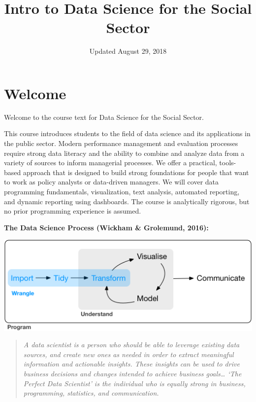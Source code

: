 \documentclass[]{book}
\title{Intro to Data Science for the Social Sector}
\author{}
\date{Updated August 29, 2018}
\theoremstyle{definition}
\theoremstyle{definition}
\theoremstyle{definition}
\theoremstyle{remark}
\begin{document}
\maketitle

{
\setcounter{tocdepth}{1}
\tableofcontents
}
\hypertarget{welcome}{%
\chapter*{Welcome}\label{welcome}}

Welcome to the course text for Data Science for the Social Sector.

This course introduces students to the field of data science and its
applications in the public sector. Modern performance management and
evaluation processes require strong data literacy and the ability to
combine and analyze data from a variety of sources to inform managerial
processes. We offer a practical, tools-based approach that is designed
to build strong foundations for people that want to work as policy
analysts or data-driven managers. We will cover data programming
fundamentals, visualization, text analysis, automated reporting, and
dynamic reporting using dashboards. The course is analytically rigorous,
but no prior programming experience is assumed.

\textbf{The Data Science Process (Wickham \& Grolemund, 2016):}

\includegraphics{figures/data-science-wrangle.png}

\begin{quote}
\emph{A data scientist is a person who should be able to leverage
existing data sources, and create new ones as needed in order to extract
meaningful information and actionable insights. These insights can be
used to drive business decisions and changes intended to achieve
business goals\ldots{} `The Perfect Data Scientist' is the individual
who is equally strong in business, programming, statistics, and
communication.}
\end{quote}
\end{document}
